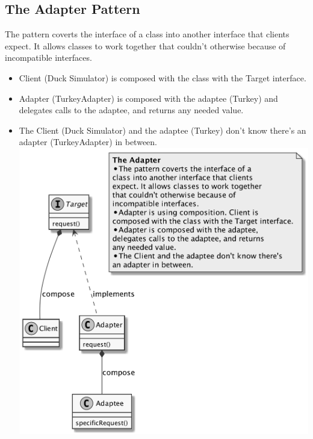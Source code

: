 \documentclass[11pt]{article}
\begin{document}
    \subsection{The Adapter Pattern}
    The pattern coverts the interface of a class into another interface that clients expect. It allows classes to work together
    that couldn't otherwise because of incompatible interfaces.
    \begin{itemize}
        \item Client (Duck Simulator) is composed with the class with the Target interface.
        \item Adapter (TurkeyAdapter) is composed with the adaptee (Turkey) and delegates calls to the adaptee, and
        returns any needed value.
        \item The Client (Duck Simulator) and the adaptee (Turkey) don't know there's an adapter (TurkeyAdapter) in between.\\
        \includegraphics[scale=0.15]{adapter/1_adapter_pattern}

\end{itemize}
\end{document}
